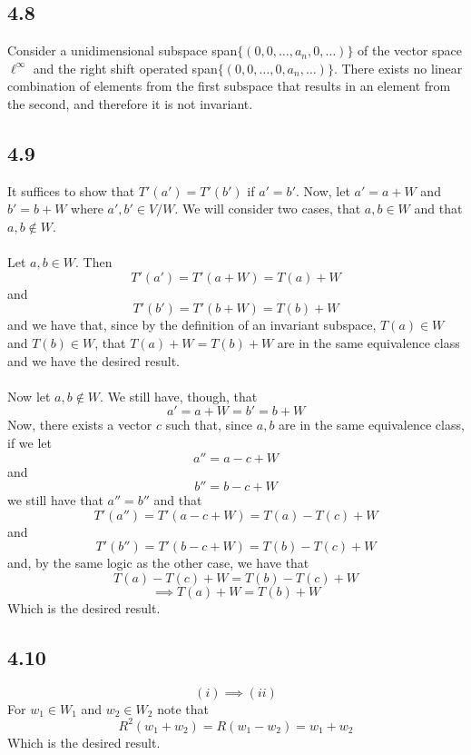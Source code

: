 \documentclass[letterpaper,12pt]{article}
\theoremstyle{definition}
\begin{document}
\subsection*{4.8}

Consider a unidimensional subspace span$\{(0,0,\dots,a_n,0,\dots)\}$ of the vector space $\ell^{\infty}$ and the right shift operated  span$\{(0,0,\dots,0,a_n,\dots)\}$. There exists no linear combination of elements from the first subspace that results in an element from the second, and therefore it is not invariant. 


\subsection*{4.9}


It suffices to show that $T'(a') = T'(b')$ if $a'=b'$. Now, let $a' = a + W$ and $b' = b + W$ where $a',b' \in V/W$. We will consider two cases, that $a,b \in W$ and that $a,b \not \in W$. \\\\
Let $a,b \in W$. Then 
\[T'(a') = T'(a + W) = T(a) + W\]
and 
\[T'(b') = T'(b + W) = T(b) + W\]
and we have that, since by the definition of an invariant subspace, $T(a) \in W$ and $T(b) \in W$, that $T(a) + W = T(b) + W$ are in the same equivalence class and we have the desired result.\\\\

Now let $a,b \not\in W$. We still have, though, that 
\[a' = a + W = b' = b+W\] 
Now, there exists a vector $c$ such that, since $a,b$ are in the same equivalence class, if we let 
\[a'' = a - c + W\]
and
\[b'' = b - c + W\]
we still have that $a'' = b''$
and that 
\[T'(a'') = T'(a - c + W) = T(a) - T(c) + W\]
and 
\[T'(b'') = T'(b - c + W) = T(b) - T(c) + W\]
and, by the same logic as the other case, we have that
\[T(a) - T(c) + W = T(b) - T(c) + W\]
\[\implies T(a)  + W = T(b)  + W\]
Which is the desired result.




\subsection*{4.10}

\[(i) \implies (ii)\]
For $w_1 \in W_1$ and $w_2 \in W_2$ note that
\[ R^2(w_1 + w_2) = R(w_1 - w_2) = w_1 + w_2 \]
Which is the desired result.
\\
\end{document}

